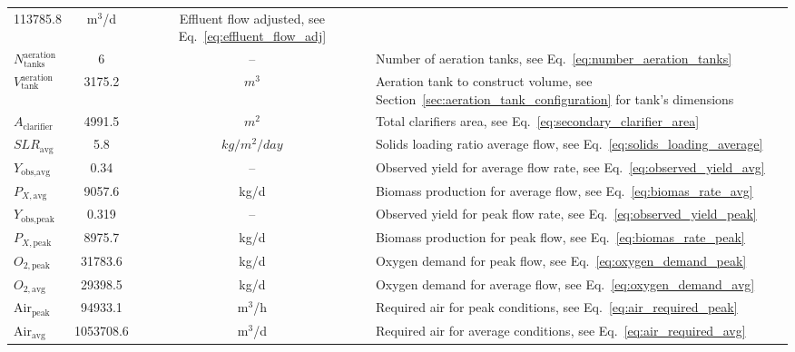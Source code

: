 \documentclass[11pt]{article}
\begin{document}
\begin{table}[h]
\begin{tabularx}{\textwidth}{|l|c|c|X|}
113785.8
& m$^3$/d & Effluent flow adjusted, see Eq.~\eqref{eq:effluent_flow_adj}\\
$N_{\text{tanks}}^{\text{aeration}}$ &
6
& -- & Number of aeration tanks, see Eq.~\eqref{eq:number_aeration_tanks}\\
$V_{\text{tank}}^{\text{aeration}}$ &
3175.2
& $m^3$ & Aeration tank to construct volume, see Section~\ref{sec:aeration_tank_configuration} for tank's dimensions \\
$A_{\text{clarifier}}$ &
4991.5
& $m^2$ & Total clarifiers area, see Eq.~\eqref{eq:secondary_clarifier_area}\\
$SLR_{\text{avg}}$ &
5.8
& $kg/m^2/day$ & Solids loading ratio average flow, see Eq.~\eqref{eq:solids_loading_average}\\
$Y_{\text{obs,avg}}$ & 
0.34
& -- & Observed yield for average flow rate, see Eq.~\eqref{eq:observed_yield_avg} \\
$P_{X,\text{avg}}$ & 
9057.6
& kg/d & Biomass production for average flow, see Eq.~\eqref{eq:biomas_rate_avg} \\
$Y_{\text{obs,peak}}$ & 
0.319
& -- & Observed yield for peak flow rate, see Eq.~\eqref{eq:observed_yield_peak} \\
$P_{X,\text{peak}}$ & 
8975.7
& kg/d & Biomass production for peak flow, see Eq.~\eqref{eq:biomas_rate_peak} \\
$O_{2,\text{peak}}$ & 
31783.6
& kg/d & Oxygen demand for peak flow, see Eq.~\eqref{eq:oxygen_demand_peak}\\
$O_{2,\text{avg}}$ &
29398.5
& kg/d & Oxygen demand for average flow, see Eq.~\eqref{eq:oxygen_demand_avg}\\
$\text{Air}_{\text{peak}}$ & 
94933.1
& m$^3$/h & Required air for peak conditions, see Eq.~\eqref{eq:air_required_peak}\\
$\text{Air}_{\text{avg}}$ & 
1053708.6
& m$^3$/d & Required air for average conditions, see Eq.~\eqref{eq:air_required_avg}\\
\hline
\end{tabularx}
\end{table}
\end{document}
